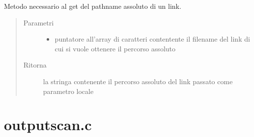 \documentclass[letterpaper,10pt,italian,openany,oneside]{sphinxmanual}
\begin{document}

\begin{fulllineitems}
\label{\detokenize{code/inputscan:c.getLinkAbsPath}}
Metodo necessario al get del pathname assoluto di un link.
\begin{quote}\begin{description}
\item[{Parametri}] \leavevmode\begin{itemize}
\item {} 
 \textendash{} puntatore all’array di caratteri contentente il filename del link di cui si vuole ottenere il percorso assoluto

\end{itemize}

\item[{Ritorna}] \leavevmode
la stringa contenente il percorso assoluto del link passato come parametro locale

\end{description}\end{quote}

\end{fulllineitems}



\section{outputscan.c}
\label{\detokenize{code/outputscan:outputscan-c}}\label{\detokenize{code/outputscan::doc}}
\end{document}
